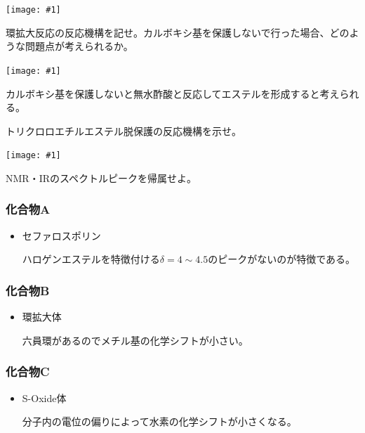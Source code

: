 \documentclass[a4paper,papersize,dvipdfmx]{jsarticle}
\newcommand{\pict}[2]{\begin{center} \texttt{[image: \#1]} \end{center}}   %
\begin{document}
\pict{imgs-k/1c.jpeg}{5}

\begin{tcolorbox}[colback=white,colbacktitle=black,coltitle=white,title={1-d.}]
環拡大反応の反応機構を記せ。カルボキシ基を保護しないで行った場合、どのような問題点が考えられるか。
\end{tcolorbox}

\pict{imgs-k/hk-1d.jpeg}{10}
カルボキシ基を保護しないと無水酢酸と反応してエステルを形成すると考えられる。

\begin{tcolorbox}[colback=white,colbacktitle=black,coltitle=white,title={1-e.}]
トリクロロエチルエステル脱保護の反応機構を示せ。
\end{tcolorbox}

\pict{imgs-k/hk-1e.jpeg}{10}


\begin{tcolorbox}[colback=white,colbacktitle=black,coltitle=white,title={2.}]
NMR・IRのスペクトルピークを帰属せよ。
\end{tcolorbox}


\subsubsection*{化合物A}
\begin{itemize}
\item セファロスポリン

ハロゲンエステルを特徴付ける$\delta = 4 \sim 4.5$のピークがないのが特徴である。
\end{itemize}

\subsubsection*{化合物B}

\begin{itemize}
\item 環拡大体

六員環があるのでメチル基の化学シフトが小さい。

\end{itemize}

\subsubsection*{化合物C}
\begin{itemize}
\item S-Oxide体

分子内の電位の偏りによって水素の化学シフトが小さくなる。
\end{itemize}
\end{document}
